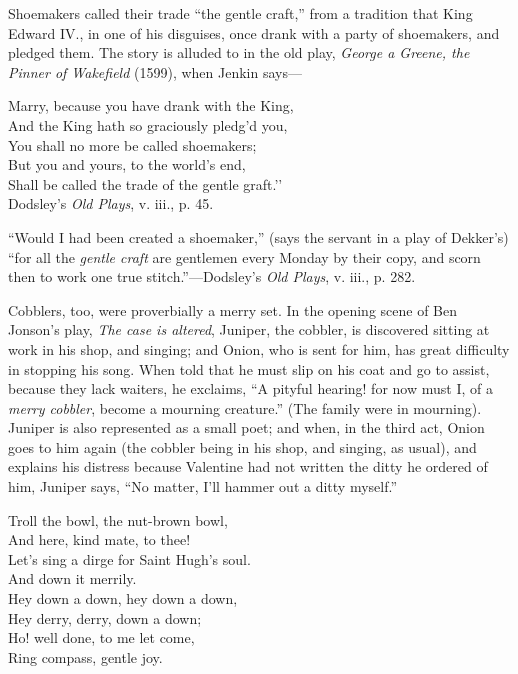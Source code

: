 Shoemakers called their trade “the gentle craft,” from a tradition that King
Edward IV., in one of his disguises, once drank with a party of shoemakers, and
pledged them. The story is alluded to in the old play, \textit{George a Greene, the
Pinner of Wakefield} (1599), when Jenkin says—
\settowidth{\versewidth}{Marry, because you have drank with the King,}
\begin{scverse}Marry, because you have drank with the King,\\
And the King hath so graciously pledg’d you,\\
You shall no more be called shoemakers;\\
But you and yours, to the world’s end,\\
Shall be called the trade of the gentle graft.’’\\
\attribution Dodsley’s \textit{Old Plays}, v. iii., p. 45.
\end{scverse}

\pagebreak

“Would I had been created a shoemaker,” (says the servant in a play of Dekker’s)
“for all the \textit{gentle craft} are gentlemen every Monday by their copy, and scorn
then to work one true stitch.”—Dodsley’s \textit{Old Plays}, v. iii., p. 282.

Cobblers, too, were proverbially a merry set. In the opening scene of Ben
Jonson’s play, \textit{The case is altered}, Juniper, the cobbler, is discovered sitting at
work in his shop, and singing; and Onion, who is sent for him, has great difficulty
in stopping his song. When told that he must slip on his coat and go to
assist, because they lack waiters, he exclaims, “A pityful hearing! for now must I,
of a \textit{merry cobbler}, become a mourning creature.” (The family were in mourning).
Juniper is also represented as a small poet; and when, in the third act, Onion
goes to him again (the cobbler being in his shop, and singing, as usual), and
explains his distress because Valentine had not written the ditty he ordered of
him, Juniper says, “No matter, I’ll hammer out a ditty myself.”


\smallskip


\settowidth{\versewidth}{Let’s sing a dirge for Saint Hugh’s soul.}
\begin{scverse}\begin{patverse}
Troll the bowl, the nut-brown bowl,\\
And here, kind mate, to thee!\\
Let’s sing a dirge for Saint Hugh’s soul.\\
And down it merrily.\\
Hey down a down, hey down a down,\\
Hey derry, derry, down a down;\\
Ho! well done, to me let come,\\
Ring compass, gentle joy.
\end{patverse}
\end{scverse}

\pagebreak